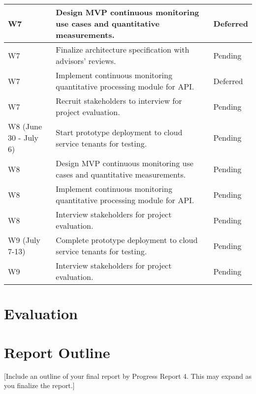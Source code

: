 \documentclass{jdf}
\begin{document}
\begin{xltabular}{\textwidth}{|l|X|l|}
    \hline
    W7 & Design MVP continuous monitoring use cases and quantitative measurements. & Deferred \\
    \hline
    W7 & Finalize architecture specification with advisors' reviews. & Pending \\
    \hline
    W7 & Implement continuous monitoring quantitative processing module for API. & Deferred \\
    \hline
    W7 & Recruit stakeholders to interview for project evaluation. & Pending \\
    \hline          
    W8 (June 30 - July 6) & Start prototype deployment to cloud service tenants for testing. & Pending \\
    \hline
    W8 & Design MVP continuous monitoring use cases and quantitative measurements. & Pending \\
    \hline
    W8 & Implement continuous monitoring quantitative processing module for API. & Pending \\
    \hline    
    W8 & Interview stakeholders for project evaluation. & Pending \\
    \hline  
    W9 (July 7-13) & Complete prototype deployment to cloud service tenants for testing. & Pending \\
    \hline
    W9 & Interview stakeholders for project evaluation. & Pending \\
    \hline
\end{xltabular}

\section*{Evaluation}



\section*{Report Outline}

[Include an outline of your final report by Progress Report 4. This may expand as you finalize the report.]

\nocite{*}



\section*{}


\end{document}
